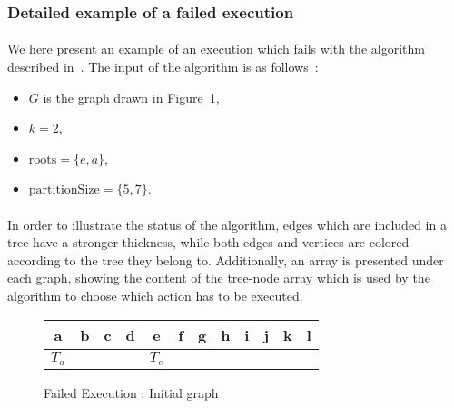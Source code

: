 \subsubsection{\label{counter-example}Detailed example of a failed execution}


\paragraph{}
We here present an example of an execution which fails with the algorithm
described in~\cite{JS94}. The input of the algorithm is as follows~:
\begin{itemize}
\item $G$ is the graph drawn in Figure~\ref{FE_K2_init},
\item $k = 2$,
\item $\mathrm{roots} = \{ e, a \}$,
\item $\mathrm{partitionSize} = \{ 5, 7\}$.
\end{itemize}

\paragraph{}
In order to illustrate the status of the algorithm, edges which are
included in a tree have a stronger thickness, while both edges and vertices are
colored according to the tree they belong to. Additionally, an array is
presented under each graph, showing the content of the tree-node array which
is used by the algorithm to choose which action has to be executed.

\begin{figure}[H]
  \caption{\label{FE_K2_init}Failed Execution : Initial graph}
  \begin{center}
    \begin{tikzpicture}[scale=0.9,transform shape]
      
    \end{tikzpicture}

    \begin{tabular}{|c|c|c|c|c|c|c|c|c|c|c|c|}
\hline
a & b & c & d & e & f & g & h & i & j & k & l\\
\hline
$T_a$ & & & & $T_e$ & & & & & & &\\
\hline
    \end{tabular}
  \end{center}
\end{figure}

